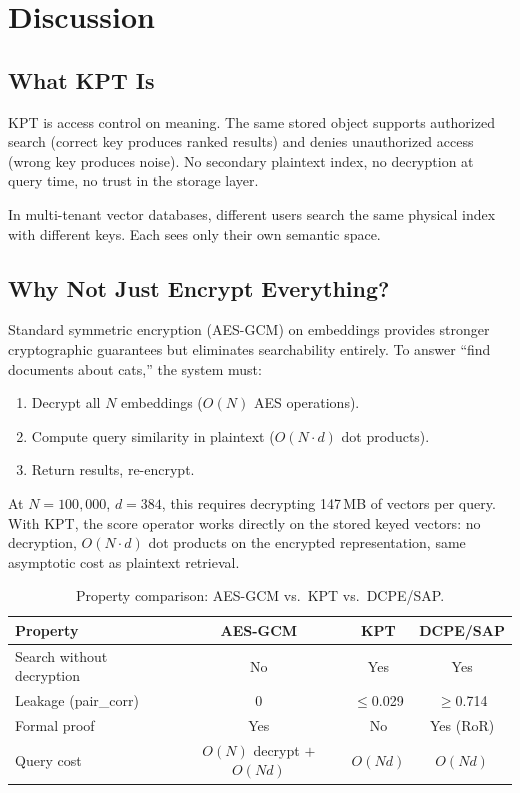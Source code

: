 \documentclass{article}
\begin{document}
\section{Discussion}
\label{sec:discussion}

\subsection{What KPT Is}

KPT is access control on meaning.
The same stored object supports authorized search (correct key produces ranked results) and denies unauthorized access (wrong key produces noise).
No secondary plaintext index, no decryption at query time, no trust in the storage layer.

In multi-tenant vector databases, different users search the same physical index with different keys.
Each sees only their own semantic space.

\subsection{Why Not Just Encrypt Everything?}

Standard symmetric encryption (AES-GCM) on embeddings provides stronger cryptographic guarantees but eliminates searchability entirely.
To answer ``find documents about cats,'' the system must:

\begin{enumerate}[nosep]
  \item Decrypt all $N$ embeddings ($O(N)$ AES operations).
  \item Compute query similarity in plaintext ($O(N \cdot d)$ dot products).
  \item Return results, re-encrypt.
\end{enumerate}

At $N{=}100{,}000$, $d{=}384$, this requires decrypting 147\,MB of vectors per query.
With KPT, the score operator works directly on the stored keyed vectors: no decryption, $O(N \cdot d)$ dot products on the encrypted representation, same asymptotic cost as plaintext retrieval.

\begin{table}[htbp]
\centering
\caption{Property comparison: AES-GCM vs.\ KPT vs.\ DCPE/SAP.}
\label{tab:property-comparison}
\begin{tabular}{@{}lccc@{}}
\toprule
\textbf{Property} & \textbf{AES-GCM} & \textbf{KPT} & \textbf{DCPE/SAP} \\
\midrule
Search without decryption & No & Yes & Yes \\
Leakage (pair\_corr) & 0 & $\leq$0.029 & $\geq$0.714 \\
Formal proof & Yes & No & Yes (RoR) \\
Query cost & $O(N)$ decrypt $+$ $O(Nd)$ & $O(Nd)$ & $O(Nd)$ \\
\bottomrule
\end{tabular}
\end{table}
\end{document}
